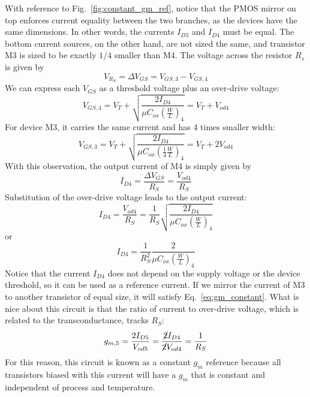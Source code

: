With reference to Fig.~\ref{fig:constant_gm_ref}, notice that the PMOS mirror on top enforces current equality between the two branches, as the devices have the same dimensions.  In other words, the currents $I_{D3}$ and $I_{D4}$ must be equal.  The bottom current sources, on the other hand, are not sized the same, and transistor M3 is sized to be exactly $1/4$ smaller than M4.  The voltage across the resistor $R_s$ is given by
\begin{equation}
	V_{R_S} = \Delta V_{GS} = V_{GS,3} - V_{GS,4}
\end{equation}
%
We can express each $V_{GS}$ as a threshold voltage plus an over-drive voltage:
%
\begin{equation}
	V_{GS,4} = V_T + \sqrt{\frac{2 I_{D4}}{\mu C_{ox} \left( \frac{W}{L} \right)_4}} = V_T + V_{od4}
\end{equation}
%
For device M3, it carries the same current and has 4 times smaller width:
%
\begin{equation}
	V_{GS,3} = V_T + \sqrt{\frac{2 I_{D4}}{\mu C_{ox} \left( \frac{1}{4} \frac{W}{L} \right)_4}} = V_T + 2V_{od4}
\end{equation}
%
With this observation, the output current of M4 is simply given by
%
\begin{equation}
	I_{D4} = \frac{\Delta V_{GS}}{R_S} = \frac{V_{od4}}{R_S}  \label{eq:gm_constant}
\end{equation}
%
Substitution of the over-drive voltage leads to the output current:
%
\begin{equation}
	I_{D4} = \frac{V_{od4}}{R_S} = \frac{1}{R_S} \sqrt{\frac{2 I_{D4}}{\mu C_{ox} \left( \frac{W}{L} \right)_4}}
\end{equation}
%
or
\begin{equation}
	I_{D4} = \frac{1}{R_S^2} \frac{2}{\mu C_{ox} \left( \frac{W}{L} \right)_4}
\end{equation}	
%
Notice that the current $I_{D4}$ does not depend on the supply voltage or the device threshold, so it can be used as a reference current.  If we mirror the current of M3 to another transistor of equal size, it will satisfy Eq.~\ref{eq:gm_constant}.  What is nice about this circuit is that the ratio of current to over-drive voltage, which is related to the transconductance, tracks $R_S$:
%
\begin{equation}
	g_{m,5} = \frac{2 I_{D5}}{V_{od5}} = \frac{\cancel{2} I_{D4}}{\cancel{2} V_{od4}} = \frac{1}{R_S} 
\end{equation}
%
For this reason, this circuit is known as a constant $g_m$ reference because all transistors biased with this current will have a $g_m$ that is constant and independent of process and temperature.


